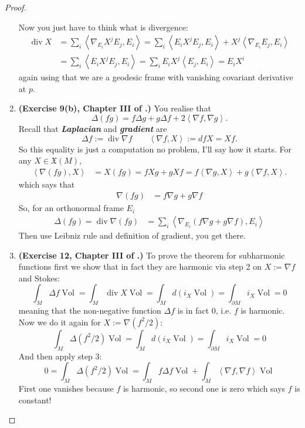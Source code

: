 \begin{proof}
\begin{enumerate}[label=\textbf{Step \arabic*}]
Now you just have to think what is divergence:
\begin{align*}
\operatorname{div}X&=\sum_{i}\left<\nabla_{E_i}X^jE_j,E_i\right>=\sum_{i}\left<E_iX^jE_j,E_i\right>+X^j\left<\nabla_{E_i}E_j,E_i\right>\\
&=\sum_i \left<E_iX^jE_j,E_i\right>=\sum_iE_iX^j\left<E_j,E_i\right>=E_iX^i
\end{align*}
again using that we are a geodesic frame with vanishing covariant derivative at \(p\).

	\item \textbf{(Exercise 9(b), Chapter III of  \cite{doc}.)} You realise that
	\[\Delta(fg)=f \Delta g + g \Delta f+2\left<\nabla f,\nabla g\right>.\]
	Recall that \textit{\textbf{Laplacian}} and \textit{\textbf{gradient}} are
	\[\Delta f:=\operatorname{div} \nabla f\qquad \left<\nabla f,X\right>:=dfX=Xf.\]
	So this equality is just a computation no problem, I'll say how it starts. For any \(X \in \mathfrak{X}(M)\),
	\begin{align*}
	\left<\nabla(fg),X\right>&=X(fg)=fXg+gXf=f\left<\nabla g,X\right>+g\left<\nabla f,X\right>.
	\end{align*}
	which says that	\begin{align*}\nabla(fg)&=f \nabla g+g \nabla f\end{align*}
	So, for an orthonormal frame \(E_i\)
	\begin{align*}\Delta(fg)=\operatorname{div} \nabla(fg)&=\sum_i\left<\nabla_{E_i}(f \nabla g+g \nabla f),E_i\right>
	\end{align*}
	Then use Leibniz rule and definition of gradient, you get there.
	
\item \textbf{(Exercise 12, Chapter III of  \cite{doc}.)} To prove the theorem for subharmonic functions first we show that in fact they are harmonic via step 2 on \(X:= \nabla f\) and Stokes:
	\[\int_M \Delta f \operatorname{Vol}=\int_M \operatorname{div}X \operatorname{Vol}=\int_M d(i_X \operatorname{Vol})=\int_{\partial M}i_X \operatorname{Vol}=0\]
meaning that the non-negative function \(\Delta f\) is in fact 0, i.e. \(f\) is harmonic. Now we do it again for \(X:=\nabla(f^2/2)\):
	\[\int_M \Delta(f^2/2)\operatorname{Vol}=\int_M d(i_X \operatorname{Vol})=\int_{\partial M}i_X \operatorname{Vol}=0\]
	And then apply step 3:
	\[0=\int_M \Delta(f^2/2)\operatorname{Vol}=\int_M f \Delta f \operatorname{Vol}+\int_M \left<\nabla f,\nabla f\right>\operatorname{Vol}\]
First one vanishes because \(f\) is harmonic, so second one is zero which says \(f\) is constant!
\end{enumerate}
\end{proof}

